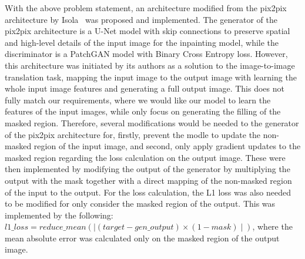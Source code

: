 \documentclass[10pt,twocolumn,letterpaper]{article}
\begin{document}
With the above problem statement, an architecture modified from the pix2pix architecture by Isola~\etal\cite{Isola2018} was proposed and implemented. The generator of the pix2pix architecture is
a U-Net model with skip connections to preserve spatial and high-level details of the input image for the inpainting model, while the discriminator is a PatchGAN
model with Binary Cross Entropy loss. However, this architecture was initiated by its authors as a solution to the image-to-image translation task, mapping the input image to the output image 
with learning the whole input image features and generating a full output image. This does not fully match our requirements, where we would like our model to learn the features of the input images, 
while only focus on generating the filling of the masked region. Therefore, several modifications would be needed to the generator of the pix2pix architecture for, firstly, prevent the modle to update 
the non-masked region of the input image, and second, only apply gradient updates to the masked region regarding the loss calculation on the output image. These were then implemented by modifying 
the output of the generator by multiplying the output with the mask together with a direct mapping of the non-masked region of the input to the output. For the loss calculation, the L1 loss was 
also needed to be modified for only consider the masked region of the output. This was implemented by the following: $l1\_loss = reduce\_mean(\mid(target - gen\_output) \times (1 - mask)\mid)$, 
where the mean absolute error was calculated only on the masked region of the output image.
\end{document}
